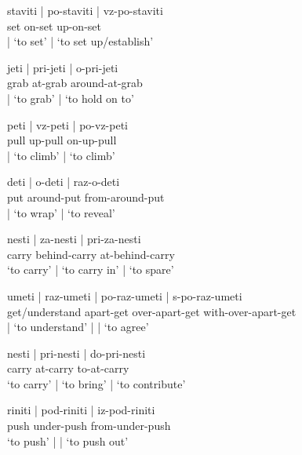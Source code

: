 \documentclass[output=paper,colorlinks,citecolor=brown]{langscibook}
\begin{document}
\ea \glll \minsp{\textsuperscript{\#}} staviti | po-staviti | vz-po-staviti\\
 {} set {} on-set  {} up-on-set\\
 {} {}  | {`to set'}  | {`to set up/establish'}\label{ex:vzpostaviti}\\
\z 

\ea  \glll  \minsp{\textsuperscript{\#}} jeti | pri-jeti | o-pri-jeti\\
 {} grab  {}  at-grab  {}  around-at-grab\\
  {} {}   |  {`to grab'}  | {`to hold on to'}\label{ex:prijeti}\\
\z

\ea \glll \minsp{\textsuperscript{\#}} peti | vz-peti | po-vz-peti\\
 {} pull {}  up-pull  {}  on-up-pull\\
 {}  {}  | {`to climb'}  | {`to climb’}\label{ex:vzpeti}\\
\z

\ea \glll  \minsp{\textsuperscript{\#}} deti | o-deti | raz-o-deti\\
 {} put  {}  around-put  {}  from-around-put\\
 {}  {}  | {`to wrap'}  | {`to reveal’}  \\
\z

\ea \glll nesti | za-nesti | pri-za-nesti\\
carry  {}  behind-carry  {}  at-behind-carry\\
{`to carry'}  | {`to carry in'}  | {`to spare’}\label{ex:prizanesti}\\
\z

\ea \glll  \minsp{\textsuperscript{\#}} umeti | raz-umeti | \minsp{\textsuperscript{\#}} po-raz-umeti | s-po-raz-umeti\\
 {} get/understand  {}  apart-get  {} {} over-apart-get {}  with-over-apart-get\\
 {} {}  | {`to understand'}  | { } {}  | {`to agree’}\label{ex:umeti}\\
\z

\ea \glll  nesti |  pri-nesti | do-pri-nesti\\
carry  {} at-carry  {}  to-at-carry\\
{`to carry'}  | {`to bring'}  | {`to contribute’}\label{ex:nesti}\\
\z

\ea  \glll  riniti | \minsp{*} pod-riniti | iz-pod-riniti\\
push  {}  {} under-push  {} from-under-push\\
{`to push'}  |  {}  {}  | {`to push out’}\label{ex:izpodrinit}\\
\z
\end{document}
